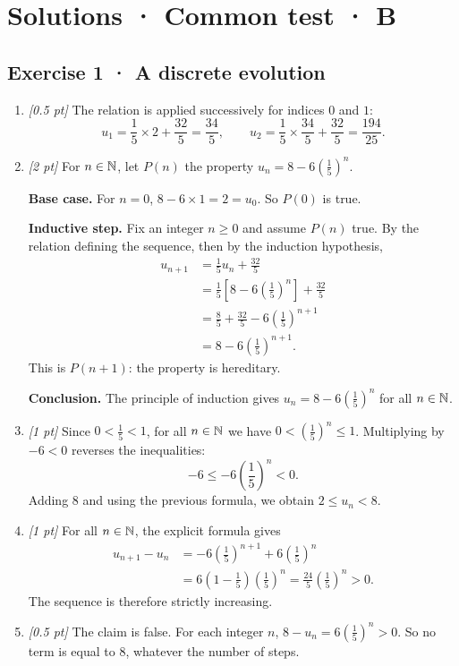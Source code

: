 \ifprof\clearpage

\section*{Solutions · Common test · B}\label{cor:3-4}

\subsection*{Exercise 1 · A discrete evolution}\begin{enumerate}

\item \textit{[0.5 pt]} The relation is applied successively for indices $0$ and $1$:\[u_1=\frac{1}{5}\times 2+\frac{32}{5}=\frac{34}{5},\qquad u_2=\frac{1}{5}\times \frac{34}{5}+\frac{32}{5}=\frac{194}{25}.\]

\item \textit{[2 pt]} For $n\in\mathbb N$, let $P(n)$ the property $u_n=8-6\left(\frac{1}{5}\right)^n$.
\par\smallskip\textbf{Base case.} For $n=0$, $8-6\times1=2=u_0$. So $P(0)$ is true.
\par\smallskip\textbf{Inductive step.} Fix an integer $n\ge0$ and assume $P(n)$ true. By the relation defining the sequence, then by the induction hypothesis,
\[\begin{aligned}u_{n+1}&=\frac{1}{5}u_n+\frac{32}{5}\\
&=\frac{1}{5}\left[8-6\left(\frac{1}{5}\right)^n\right]+\frac{32}{5}\\
&=\frac{8}{5}+\frac{32}{5}-6\left(\frac{1}{5}\right)^{n+1}\\
&=8-6\left(\frac{1}{5}\right)^{n+1}.
\end{aligned}\]
This is $P(n+1)$: the property is hereditary.
\par\smallskip\textbf{Conclusion.} The principle of induction gives $u_n=8-6\left(\frac{1}{5}\right)^n$ for all $n\in\mathbb N$.

\item \textit{[1 pt]} Since $0<\frac{1}{5}<1$, for all $n\in\mathbb N$ we have $0<(\frac{1}{5})^n\le1$. Multiplying by $-6<0$ reverses the inequalities:
\[-6\le-6(\frac{1}{5})^n<0.\]
Adding $8$ and using the previous formula, we obtain $2\le u_n<8$.

\item \textit{[1 pt]} For all $n\in\mathbb N$, the explicit formula gives
\[\begin{aligned}u_{n+1}-u_n&=-6(\frac{1}{5})^{n+1}+6(\frac{1}{5})^n\\&=6(1-\frac{1}{5})(\frac{1}{5})^n=\frac{24}{5}(\frac{1}{5})^n>0.\end{aligned}\]
The sequence is therefore strictly increasing.

\item \textit{[0.5 pt]} The claim is false. For each integer $n$, $8-u_n=6(\frac{1}{5})^n>0$. So no term is equal to $8$, whatever the number of steps.

\end{enumerate}

